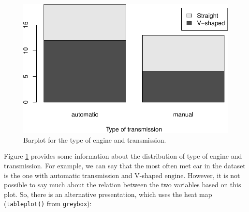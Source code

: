 \documentclass[
]{book}
\newenvironment{Shaded}{\begin{snugshade}}{\end{snugshade}}
\newcommand{\DataTypeTok}[1]{\textcolor[rgb]{0.13,0.29,0.53}{#1}}
\newcommand{\KeywordTok}[1]{\textcolor[rgb]{0.13,0.29,0.53}{\textbf{#1}}}
\newcommand{\NormalTok}[1]{#1}
\newcommand{\OperatorTok}[1]{\textcolor[rgb]{0.81,0.36,0.00}{\textbf{#1}}}
\newcommand{\StringTok}[1]{\textcolor[rgb]{0.31,0.60,0.02}{#1}}
\theoremstyle{definition}
\theoremstyle{definition}
\theoremstyle{definition}
\theoremstyle{definition}
\theoremstyle{remark}
\begin{document}
\begin{Shaded}
\end{Shaded}

\begin{figure}
\centering
\includegraphics{Svetunkov---Statistics-for-Business-Analytics_files/figure-latex/barplotVSAM-1.pdf}
\caption{\label{fig:barplotVSAM}Barplot for the type of engine and transmission.}
\end{figure}

Figure \ref{fig:barplotVSAM} provides some information about the distribution of type of engine and transmission. For example, we can say that the most often met car in the dataset is the one with automatic transmission and V-shaped engine. However, it is not possible to say much about the relation between the two variables based on this plot. So, there is an alternative presentation, which uses the heat map (\texttt{tableplot()} from \texttt{greybox}):

\begin{Shaded}
\end{Shaded}
\end{document}
